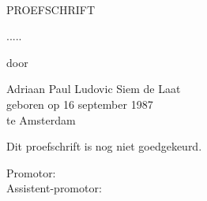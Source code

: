 \begin{center}

\vspace*{2cm}

\textlarger[3]{\hisparc}
\\[1em]


\begin{onehalfspace}

\vspace{2cm}

PROEFSCHRIFT

\vspace{2cm}

.....\\

\vspace{1cm}

door

\vspace{1cm}

Adriaan Paul Ludovic Siem de Laat\\
geboren op 16 september 1987\\
te Amsterdam

\end{onehalfspace}
\end{center}


\newpage


\noindent
Dit proefschrift is nog niet goedgekeurd.
\begin{tabbing}
Promotor: \\
Assistent-promotor:
\end{tabbing}
